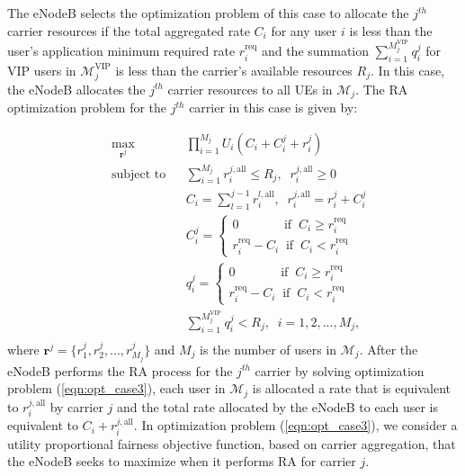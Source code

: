 \documentclass[journal]{IEEEtran} 				\IEEEoverridecommandlockouts 						\usepackage{amsmath,amssymb}
\begin{document}
The eNodeB selects the optimization problem of this case to allocate the $j^{th}$ carrier resources if the total aggregated rate $C_i$ for any user $i$ is less than the user's application minimum required rate $r_i^{\text{req}}$ and the summation $\sum_{i=1}^{M_j^{\text{VIP}}}q_i^j$ for VIP users in $\mathcal{M}_j^{\text{VIP}}$ is less than the carrier's available resources $R_j$. In this case, the eNodeB allocates the $j^{th}$ carrier resources to all UEs in $\mathcal{M}_j$. The RA optimization problem for the $j^{th}$ carrier in this case is given by:

\begin{equation}\label{eqn:opt_case3}
\begin{aligned}
& \underset{\textbf{r}^j}{\text{max}}
& & \prod_{i=1}^{M_j}U_i(C_i+C_i^j+r_i^j) \\
& \text{subject to}
& & \sum_{i=1}^{M_j}r_i^{j,\text{all}} \leq R_j,\;\;r_i^{j,\text{all}} \geq 0\\
& & & C_i=\sum_{l=1}^{j-1}r_i^{l,\text{all}},\;\;r_i^{j,\text{all}}=r_i^j+C_i^j\\
& & & C_i^j=
\begin{cases}
	0 \;\;\;\;\;\;\;\;\;\;\;\;\; \text{if}\;\; C_i \geq r_i^{\text{req}}\\
	r_i^{\text{req}}-C_i \;\;\text{if}\;\; C_i < r_i^{\text{req}}
\end{cases}\\
& & & q_i^j=
\begin{cases}
	0 \;\;\;\;\;\;\;\;\;\;\;\;\; \text{if}\;\; C_i \geq r_i^{\text{req}}\\
	r_i^{\text{req}}-C_i \;\;\text{if}\;\; C_i < r_i^{\text{req}}
\end{cases}\\
& & & \sum_{i=1}^{M_j^{\text{VIP}}}q_i^j < R_j, \;\; i = 1,2, ...,M_j,\\
\end{aligned}
\end{equation}
where $\textbf{r}^j =\{r_1^j,r_2^j,...,r_{M_j}^j\}$ and $M_j$ is the number of users in $\mathcal{M}_j$. After the eNodeB performs the RA process for the $j^{th}$ carrier by solving optimization problem (\ref{eqn:opt_case3}), each user in $\mathcal{M}_j$ is allocated a rate that is equivalent to $r_i^{j,\text{all}}$ by carrier $j$ and the total rate allocated by the eNodeB to each user is equivalent to $C_i+r_i^{j,\text{all}}$. In optimization problem (\ref{eqn:opt_case3}), we consider a utility proportional fairness objective function, based on carrier aggregation, that the eNodeB seeks to maximize when it performs RA for carrier $j$.
\end{document}
